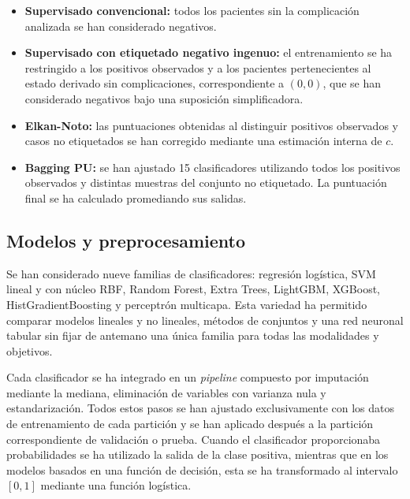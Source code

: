 \begin{itemize}
    \item \textbf{Supervisado convencional:} todos los pacientes sin la complicación analizada se han considerado negativos.


    \item \textbf{Supervisado con etiquetado negativo ingenuo:} el entrenamiento se ha restringido a los positivos observados y a los pacientes pertenecientes al estado derivado sin complicaciones, correspondiente a \((0,0)\), que se han considerado negativos bajo una suposición simplificadora.


    \item \textbf{Elkan-Noto:} las puntuaciones obtenidas al distinguir positivos observados y casos no etiquetados se han corregido mediante una estimación interna de \(c\).

    \item \textbf{Bagging PU:} se han ajustado 15 clasificadores utilizando todos los positivos observados y distintas muestras del conjunto no etiquetado. La puntuación final se ha calculado promediando sus salidas.
\end{itemize}


\subsection{Modelos y preprocesamiento}

Se han considerado nueve familias de clasificadores: regresión logística, SVM lineal y con núcleo RBF, Random Forest, Extra Trees, LightGBM, XGBoost, HistGradientBoosting y perceptrón multicapa. Esta variedad ha permitido comparar modelos lineales y no lineales, métodos de conjuntos y una red neuronal tabular sin fijar de antemano una única familia para todas las modalidades y objetivos.

Cada clasificador se ha integrado en un \textit{pipeline} compuesto por imputación mediante la mediana, eliminación de variables con varianza nula y estandarización. Todos estos pasos se han ajustado exclusivamente con los datos de entrenamiento de cada partición y se han aplicado después a la partición correspondiente de validación o prueba. Cuando el clasificador proporcionaba probabilidades se ha utilizado la salida de la clase positiva, mientras que en los modelos basados en una función de decisión, esta se ha transformado al intervalo \([0,1]\) mediante una función logística.

